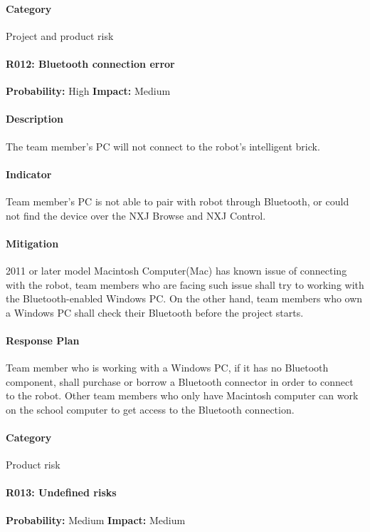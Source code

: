 \documentclass[11pt, a4paper]{report}
\begin{document}
	\paragraph{Category} Project and product risk

	\paragraph{R012: Bluetooth connection error} \hspace{1cm} \textbf{Probability: }High\hspace{1cm}   \textbf{Impact: }Medium
	\paragraph{Description}The team member's PC will not connect to the robot's intelligent brick.
	\paragraph{Indicator}Team member's PC is not able to pair with robot through Bluetooth, or could not find the device over the NXJ Browse and NXJ Control. 
	\paragraph{Mitigation}2011 or later model Macintosh Computer(Mac) has known issue of connecting with the robot, team members who are facing such issue shall try to working with the Bluetooth-enabled Windows PC. On the other hand, team members who own a Windows PC shall check their Bluetooth before the project starts. 
	\paragraph{Response Plan}Team member who is working with a Windows PC, if it has no Bluetooth component, shall purchase or borrow a Bluetooth connector in order to connect to the robot. Other team members who only have Macintosh computer can work on the school computer to get access to the Bluetooth connection.\\
	\paragraph{Category} Product risk

	\paragraph{R013: Undefined risks} \hspace{1cm} \textbf{Probability: }Medium\hspace{1cm}   \textbf{Impact: }Medium
\end{document}

